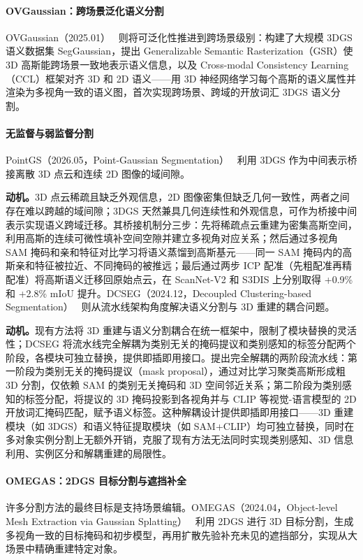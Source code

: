 \paragraph{OVGaussian：跨场景泛化语义分割} OVGaussian（2025.01）~\cite{2501_00326} 则将可泛化性推进到跨场景级别：构建了大规模 3DGS 语义数据集 SegGaussian，提出 Generalizable Semantic Rasterization（GSR）使 3D 高斯能跨场景一致地表示语义信息，以及 Cross-modal Consistency Learning（CCL）框架对齐 3D 和 2D 语义——用 3D 神经网络学习每个高斯的语义属性并渲染为多视角一致的语义图，首次实现跨场景、跨域的开放词汇 3DGS 语义分割。

\paragraph{无监督与弱监督分割} PointGS（2026.05，Point-Gaussian Segmentation）~\cite{2605_11520} 利用 3DGS 作为中间表示桥接离散 3D 点云和连续 2D 图像的域间隙。

\textbf{动机。}3D 点云稀疏且缺乏外观信息，2D 图像密集但缺乏几何一致性，两者之间存在难以跨越的域间隙；3DGS 天然兼具几何连续性和外观信息，可作为桥接中间表示实现语义跨域迁移。其桥接机制分三步：先将稀疏点云重建为密集高斯空间，利用高斯的连续可微性填补空间空隙并建立多视角对应关系；然后通过多视角 SAM 掩码和亲和特征对比学习将语义蒸馏到高斯基元——同一 SAM 掩码内的高斯亲和特征被拉近、不同掩码的被推远；最后通过两步 ICP 配准（先粗配准再精配准）将高斯语义迁移回原始点云，在 ScanNet-V2 和 S3DIS 上分别取得 +0.9\% 和 +2.8\% mIoU 提升。DCSEG（2024.12，Decoupled Clustering-based Segmentation）~\cite{2412_10972} 则从流水线架构角度解决语义分割与 3D 重建的耦合问题。

\textbf{动机。}现有方法将 3D 重建与语义分割耦合在统一框架中，限制了模块替换的灵活性；DCSEG 将流水线完全解耦为类别无关的掩码提议和类别感知的标签分配两个阶段，各模块可独立替换，提供即插即用接口。提出完全解耦的两阶段流水线：第一阶段为类别无关的掩码提议（mask proposal），通过对比学习聚类高斯形成粗 3D 分割，仅依赖 SAM 的类别无关掩码和 3D 空间邻近关系；第二阶段为类别感知的标签分配，将提议的 3D 掩码投影到各视角并与 CLIP 等视觉-语言模型的 2D 开放词汇掩码匹配，赋予语义标签。这种解耦设计提供即插即用接口——3D 重建模块（如 3DGS）和语义特征提取模块（如 SAM+CLIP）均可独立替换，同时在多对象实例分割上无额外开销，克服了现有方法无法同时实现类别感知、3D 信息利用、实例区分和解耦重建的局限性。

\paragraph{OMEGAS：2DGS 目标分割与遮挡补全} 许多分割方法的最终目标是支持场景编辑。OMEGAS（2024.04，Object-level Mesh Extraction via Gaussian Splatting）~\cite{2404_15891} 利用 2DGS 进行 3D 目标分割，生成多视角一致的目标掩码和初步模型，再用扩散先验补充未见的遮挡部分，实现从大场景中精确重建特定对象。

